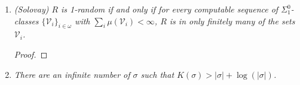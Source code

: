 \documentclass{article}
\begin{document}
\begin{enumerate}
\begin{proof}
      At stage $n+1$, we have $D_n=\{a_{n-1}+1,\ldots,a_n\}$ for some
      $a_{n-1}<a_n\in\omega$. We work within $\mathcal{A}_{a_n+1}$.
      Consider each string $\sigma\in2^{a_n}$ of length $a_n$. For each
      such string $\sigma$, the function $z_\sigma\in2^\omega$ that extends
      $\sigma$ with zeros (i.e. $z_\sigma\restriction|\sigma|=\sigma$ and
      $z_\sigma(x)=0$ if $x\geq|\sigma|$) is computable, hence must have an
      initial segment $\tau_\sigma$ contained in $A_{a_n+1}$. We enumerate
      the strings of $A_{a_n+1}$ until we get all initial segments
      $\tau_\sigma$ for each $\sigma$ in $2^{a_n}$. Now none of these
      strings $\tau_\sigma$ can be an initial segment of $f$ since
      $f\not\in\mathcal{A}_{a_n+1}$. Yet one of these strings
      $\tau_{f\restriction a_n}$ has an initial segment of length $a_n$ is
      the same as $f\restriction a_n$. But since $f$ does not extend
      $\tau_{f\restriction a_n}$, $f(x)$ must equal 1 at some
      $x\in\{a_n,\ldots,|\tau_{f\restriction a_n}|\}$. In particular, 
      $\{x:f(x)=1\}\cap\{a_n+1,\ldots,a_{n+1}\} \neq\emptyset$, where
      $a_{n+1}$ is defined as
      \[a_{n+1} =\max\{|\tau_\sigma|: \sigma\in2^{a_n}\}.\]
      So set $D_{n+1}=\{a_n+1,\ldots,a_{n+1}\}$. \\
    \end{proof}

  \item \it (Solovay) $R$ is 1-random if and only if for every computable
    sequence of $\Sigma^0_1$-classes $\{\mathcal{V}_i\}_{i\in\omega}$ with
    $\sum_i \mu(\mathcal{V}_i)<\infty$, $R$ is in only finitely many of the
    sets $\mathcal{V}_i$.

    \begin{proof}
    \end{proof}

  \item \it There are an infinite number of $\sigma$ such that
    $K(\sigma)>|\sigma|+\log(|\sigma|)$.


\end{enumerate}
\end{document}

